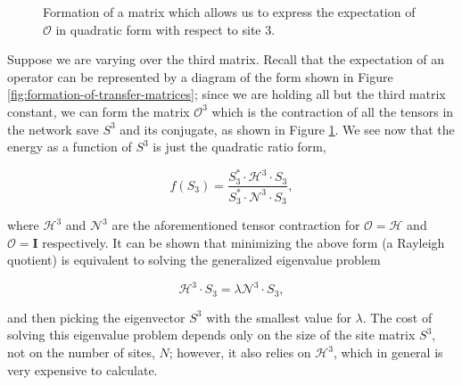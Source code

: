 \documentclass[12pt]{amsbook}
\theoremstyle{plain}
\theoremstyle{definition}
\theoremstyle{remark}
\begin{document}
\begin{figure}
\caption{Formation of a matrix which allows us to express the expectation of $\mathscr{O}$ in quadratic form with respect to site 3.}
\label{fig:Omatrix}
\end{figure}

Suppose we are varying over the third matrix.  Recall that the expectation of an operator can be represented by a diagram of the form shown in Figure \ref{fig:formation-of-transfer-matrices};  since we are holding all but the third matrix constant, we can form the matrix $\mathscr{O}^{3}$ which is the contraction of all the tensors in the network save $S^3$ and its conjugate, as shown in Figure \ref{fig:Omatrix}.  We see now that the energy as a function of $S^3$ is just the quadratic ratio form,

$$f(S_3) = \frac{S^*_3\cdot \mathscr{H}^3 \cdot S_3}{S^*_3 \cdot \mathscr{N}^3 \cdot S_3},$$

\noindent where $\mathscr{H}^3$ and $\mathscr{N}^3$ are the aforementioned tensor contraction for $\mathscr{O}=\mathscr{H}$ and $\mathscr{O}=\textbf{I}$ respectively.  It can be shown that minimizing the above form (a Rayleigh quotient) is equivalent to solving the generalized eigenvalue problem

$$\mathscr{H}^3 \cdot S_3 = \lambda \mathscr{N}^3\cdot S_3,$$

\noindent and then picking the eigenvector $S^3$ with the smallest value for $\lambda$.  The cost of solving this eigenvalue problem depends only on the size of the site matrix $S^3$, not on the number of sites, $N$;  however, it also relies on $\mathscr{H}^3$, which in general is very expensive to calculate.
\end{document}

